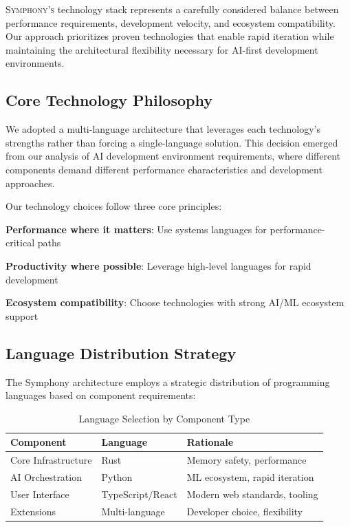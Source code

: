 
\lettrine{S}{ymphony's} technology stack represents a carefully considered balance between performance requirements, development velocity, and ecosystem compatibility. Our approach prioritizes proven technologies that enable rapid iteration while maintaining the architectural flexibility necessary for AI-first development environments.

\subsection*{Core Technology Philosophy}

We adopted a \textcolor{brandPrimary}{multi-language architecture} that leverages each technology's strengths rather than forcing a single-language solution. This decision emerged from our analysis of AI development environment requirements, where different components demand different performance characteristics and development approaches.

\begin{infobox}[title=Technology Selection Principles]
Our technology choices follow three core principles:
\begin{compactlist}
    \item \textbf{Performance where it matters}: Use systems languages for performance-critical paths
    \item \textbf{Productivity where possible}: Leverage high-level languages for rapid development
    \item \textbf{Ecosystem compatibility}: Choose technologies with strong AI/ML ecosystem support
\end{compactlist}
\end{infobox}

\subsection*{Language Distribution Strategy}

The Symphony architecture employs a strategic distribution of programming languages based on component requirements:

\begin{table}[ht]
\centering
\begin{tabular}{@{}lll@{}}
\toprule
\textbf{Component} & \textbf{Language} & \textbf{Rationale} \\
\midrule
Core Infrastructure & Rust & Memory safety, performance \\
AI Orchestration & Python & ML ecosystem, rapid iteration \\
User Interface & TypeScript/React & Modern web standards, tooling \\
Extensions & Multi-language & Developer choice, flexibility \\
\bottomrule
\end{tabular}
\caption{Language Selection by Component Type}
\end{table}

